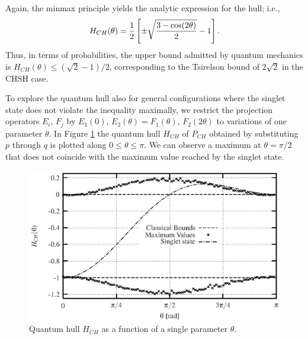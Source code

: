 Again, the minmax principle yields the analytic expression for the hull; i.e.,
\begin{equation}
H_{CH}(\theta )={1\over 2}\left[\pm {\sqrt{3-\cos (2\theta )\over 2}} - 1 \right]
.
\end{equation}
Thus, in terms of
probabilities,
the upper bound admitted by quantum mechanics is
$H_{CH}(\theta ) \le (\sqrt{2}-1) /2$, corresponding to the Tsirelson bound of $2\sqrt{2}$
in the CHSH case.

To explore the quantum hull also for general configurations where
the singlet state does not violate the inequality maximally,
we restrict the projection operators $E_i,\,F_j$ by
${E}_1(0)$, ${E}_2(\theta)={F}_1(\theta)$, ${F}_2(2\theta)$ to variations of one parameter
$\theta$.
In Figure  \ref{f-2003-qpoly-3} the quantum hull  $H_{CH}$ of $P_{CH}$
obtained by substituting $p$ through $q$ is plotted
along $0 \le \theta \le \pi$. We can observe a maximum at
$\theta=\pi/2$ that does not coincide with the maximum value reached
by the singlet state.
\begin{figure}
  \centering
  \includegraphics[clip]{2003-qpoly-plotch}
  \caption{Quantum hull $H_{CH}$
as a function of a single parameter $\theta$.}
  \label{f-2003-qpoly-3}
\end{figure}

